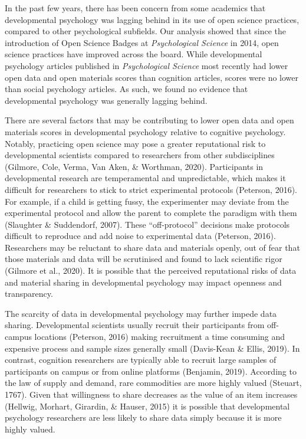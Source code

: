\documentclass[
  english,
  man,floatsintext]{apa6}
\begin{document}
In the past few years, there has been concern from some academics that developmental psychology was lagging behind in its use of open science practices, compared to other psychological subfields. Our analysis showed that since the introduction of Open Science Badges at \emph{Psychological Science} in 2014, open science practices have improved across the board. While developmental psychology articles published in \emph{Psychological Science} most recently had lower open data and open materials scores than cognition articles, scores were no lower than social psychology articles. As such, we found no evidence that developmental psychology was generally lagging behind.

There are several factors that may be contributing to lower open data and open materials scores in developmental psychology relative to cognitive psychology. Notably, practicing open science may pose a greater reputational risk to developmental scientists compared to researchers from other subdisciplines (Gilmore, Cole, Verma, Van Aken, \& Worthman, 2020). Participants in developmental research are temperamental and unpredictable, which makes it difficult for researchers to stick to strict experimental protocols (Peterson, 2016). For example, if a child is getting fussy, the experimenter may deviate from the experimental protocol and allow the parent to complete the paradigm with them (Slaughter \& Suddendorf, 2007). These ``off-protocol'' decisions make protocols difficult to reproduce and add noise to experimental data (Peterson, 2016). Researchers may be reluctant to share data and materials openly, out of fear that those materials and data will be scrutinised and found to lack scientific rigor (Gilmore et al., 2020). It is possible that the perceived reputational risks of data and material sharing in developmental psychology may impact openness and transparency.

The scarcity of data in developmental psychology may further impede data sharing. Developmental scientists usually recruit their participants from off-campus locations (Peterson, 2016) making recruitment a time consuming and expensive process and sample sizes generally small (Davis-Kean \& Ellis, 2019). In contrast, cognition researchers are typically able to recruit large samples of participants on campus or from online platforms (Benjamin, 2019). According to the law of supply and demand, rare commodities are more highly valued (Steuart, 1767). Given that willingness to share decreases as the value of an item increases (Hellwig, Morhart, Girardin, \& Hauser, 2015) it is possible that developmental psychology researchers are less likely to share data simply because it is more highly valued.
\end{document}

